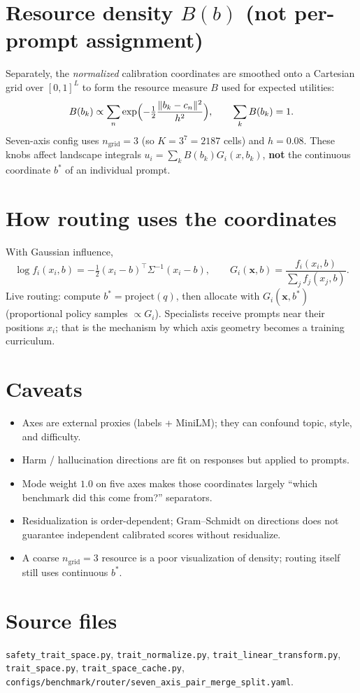 \documentclass[11pt]{article}
\begin{document}
\section{Resource density \(B(b)\) (not per-prompt assignment)}
Separately, the \emph{normalized} calibration coordinates are smoothed onto a
Cartesian grid over \([0,1]^L\) to form the resource measure \(B\) used for
expected utilities:
\[
B(b_k)\propto\sum_n\exp\Bigl(-\tfrac12\frac{\|b_k-c_n\|^2}{h^2}\Bigr),
\qquad\sum_k B(b_k)=1.
\]
Seven-axis config uses \(n_{\mathrm{grid}}=3\) (so \(K=3^7=2187\) cells) and
\(h=0.08\). These knobs affect landscape integrals \(u_i=\sum_k B(b_k)G_i(x,b_k)\),
\textbf{not} the continuous coordinate \(b^\ast\) of an individual prompt.

\section{How routing uses the coordinates}
With Gaussian influence,
\[
\log f_i(x_i,b)=-\tfrac12(x_i-b)^\top\Sigma^{-1}(x_i-b),
\qquad
G_i(\mathbf{x},b)=\frac{f_i(x_i,b)}{\sum_j f_j(x_j,b)}.
\]
Live routing: compute \(b^\ast=\mathrm{project}(q)\), then allocate with
\(G_i(\mathbf{x},b^\ast)\) (proportional policy samples \(\propto G_i\)).
Specialists receive prompts near their positions \(x_i\); that is the mechanism by
which axis geometry becomes a training curriculum.

\section{Caveats}
\begin{itemize}[leftmargin=1.4em]
  \item Axes are external proxies (labels + MiniLM); they can confound topic, style,
        and difficulty.
  \item Harm / hallucination directions are fit on responses but applied to prompts.
  \item Mode weight \(1.0\) on five axes makes those coordinates largely
        ``which benchmark did this come from?'' separators.
  \item Residualization is order-dependent; Gram--Schmidt on directions does not
        guarantee independent calibrated scores without residualize.
  \item A coarse \(n_{\mathrm{grid}}=3\) resource is a poor visualization of density;
        routing itself still uses continuous \(b^\ast\).
\end{itemize}

\section*{Source files}
\texttt{safety\_trait\_space.py},
\texttt{trait\_normalize.py},
\texttt{trait\_linear\_transform.py},
\texttt{trait\_space.py},
\texttt{trait\_space\_cache.py},
\texttt{configs/benchmark/router/seven\_axis\_pair\_merge\_split.yaml}.
\end{document}
